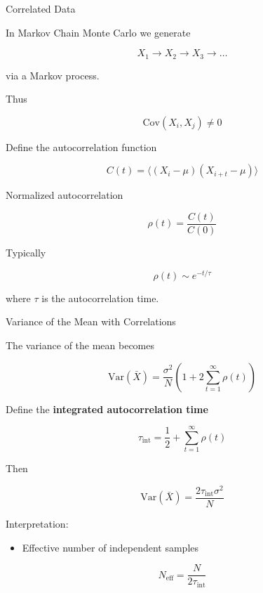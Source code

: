 \documentclass{beamer}
\begin{document}

\begin{frame}{Correlated Data}

  In Markov Chain Monte Carlo we generate

  \[
  X_1 \rightarrow X_2 \rightarrow X_3 \rightarrow \dots
  \]

  via a Markov process.

  Thus

  \[
  \text{Cov}(X_i,X_j) \neq 0
  \]

  Define the autocorrelation function

  \[
  C(t)
  =
  \langle (X_i-\mu)(X_{i+t}-\mu) \rangle
  \]

  Normalized autocorrelation

  \[
  \rho(t) = \frac{C(t)}{C(0)}
  \]

  Typically

  \[
  \rho(t) \sim e^{-t/\tau}
  \]

  where $\tau$ is the autocorrelation time.
\end{frame}


\begin{frame}{Variance of the Mean with Correlations}

  The variance of the mean becomes

  \[
  \mathrm{Var}(\bar X)
  =
  \frac{\sigma^2}{N}
  \left(
  1
  +
  2\sum_{t=1}^{\infty}\rho(t)
  \right)
  \]

  Define the \textbf{integrated autocorrelation time}

  \[
  \tau_{\mathrm{int}}
  =
  \frac{1}{2}
  +
  \sum_{t=1}^{\infty}\rho(t)
  \]

  Then

  \[
  \mathrm{Var}(\bar X)
  =
  \frac{2\tau_{\mathrm{int}}\sigma^2}{N}
  \]

  Interpretation:

  \begin{itemize}
  \item Effective number of independent samples
  \end{itemize}

  \[
  N_{\mathrm{eff}}
  =
  \frac{N}{2\tau_{\mathrm{int}}}
  \]
\end{frame}

\end{document}
